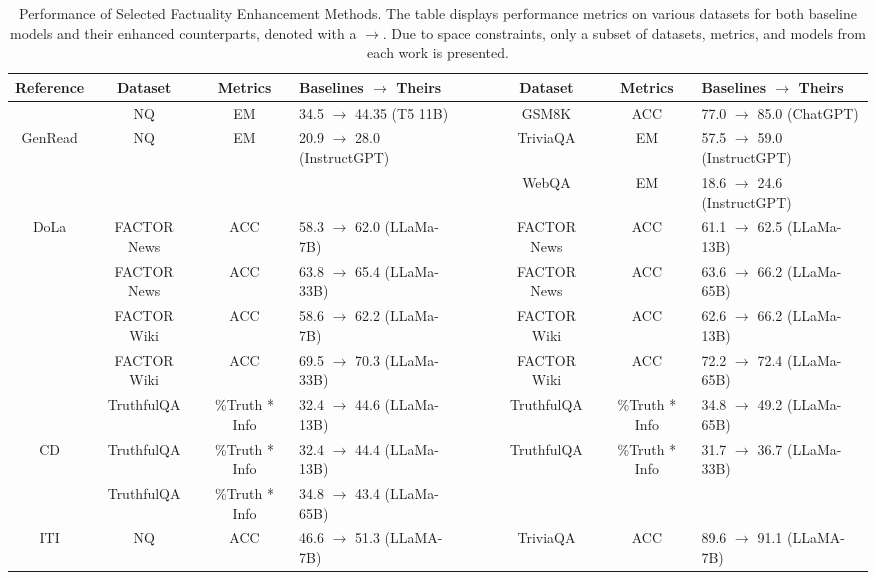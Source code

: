 
\begin{table}[t]\small
\centering
\caption{Performance of Selected Factuality Enhancement Methods. The table displays performance metrics on various datasets for both baseline models and their enhanced counterparts, denoted with a $\rightarrow$. Due to space constraints, only a subset of datasets, metrics, and models from each work is presented.}
\label{tab:enhance-table}
\vspace{-2mm}
\begin{adjustbox}{max width=\textwidth}
  \setlength{\tabcolsep}{.3mm}
    \renewcommand{\arraystretch}{1.2}
{\begin{tabular}{ccclc|c|ccl}
\toprule 
Reference & Dataset & Metrics & Baselines $\rightarrow$ Theirs &&& Dataset & Metrics & Baselines $\rightarrow$ Theirs \\     
\midrule  
\citet{li2022decoupled} & NQ & EM & 34.5 $\rightarrow$ 44.35 (T5 11B) & & & GSM8K & ACC & 77.0 $\rightarrow$ 85.0 (ChatGPT) \\
\midrule  
GenRead \citep{yu2023generate} & NQ & EM & 20.9 $\rightarrow$ 28.0 (InstructGPT) &&& TriviaQA & EM & 57.5 $\rightarrow$ 59.0 (InstructGPT) \\
& & & &&& WebQA & EM & 18.6 $\rightarrow$ 24.6 (InstructGPT) \\
\midrule  
DoLa \citep{chuang2023dola} & FACTOR News & ACC & 58.3 $\rightarrow$ 62.0 (LLaMa-7B) &&& FACTOR News & ACC & 61.1 $\rightarrow$ 62.5 (LLaMa-13B) \\
& FACTOR News & ACC& 63.8 $\rightarrow$ 65.4 (LLaMa-33B) &&& FACTOR News & ACC& 63.6 $\rightarrow$ 66.2 (LLaMa-65B) \\
& FACTOR Wiki  & ACC & 58.6 $\rightarrow$ 62.2 (LLaMa-7B) &&& FACTOR Wiki  & ACC & 62.6 $\rightarrow$ 66.2 (LLaMa-13B) \\
& FACTOR Wiki  & ACC& 69.5 $\rightarrow$ 70.3 (LLaMa-33B) &&& FACTOR Wiki  & ACC& 72.2 $\rightarrow$ 72.4 (LLaMa-65B) \\
& TruthfulQA & \%Truth * Info & 32.4 $\rightarrow$ 44.6 (LLaMa-13B) &&& TruthfulQA & \%Truth * Info  & 34.8 $\rightarrow$ 49.2 (LLaMa-65B) \\
\midrule
CD \citep{li2022contrastive} & TruthfulQA & \%Truth * Info & 32.4 $\rightarrow$ 44.4 (LLaMa-13B) &&& TruthfulQA & \%Truth * Info & 31.7 $\rightarrow$ 36.7 (LLaMa-33B) \\
& TruthfulQA & \%Truth * Info & 34.8 $\rightarrow$ 43.4 (LLaMa-65B) &&& \\
\midrule
ITI \citep{li2023inferencetime} & NQ & ACC & 46.6 $\rightarrow$ 51.3 (LLaMA-7B) &&& TriviaQA & ACC & 89.6 $\rightarrow$ 91.1 (LLaMA-7B) \\

\end{tabular}}
\end{adjustbox}
\end{table}
